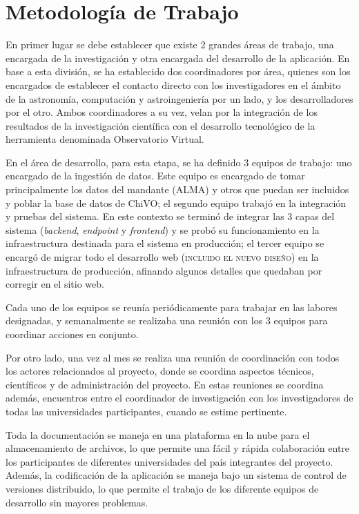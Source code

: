 \section{Metodología de Trabajo}

En primer lugar se debe establecer que existe 2 grandes áreas de trabajo, una encargada de la investigación y otra encargada del desarrollo de la aplicación. En base a esta división, se ha establecido dos coordinadores por área, quienes son los encargados de establecer el contacto directo con los investigadores en el ámbito de la astronomía, computación y astroingeniería por un lado, y los desarrolladores por el otro. Ambos coordinadores a su vez, velan por la integración de los resultados de la investigación científica con el desarrollo tecnológico de la herramienta denominada Observatorio Virtual.

En el área de desarrollo, para esta etapa, se ha definido 3 equipos de trabajo: uno encargado de la ingestión de datos. Este equipo es encargado de tomar principalmente los datos del mandante (ALMA) y otros que puedan ser incluidos y poblar la base de datos de ChiVO; el segundo equipo trabajó en la integración y pruebas del sistema. En este contexto se terminó de integrar las 3 capas del sistema (\emph{backend}, \emph{endpoint} y \emph{frontend}) y se probó su funcionamiento en la infraestructura destinada para el sistema en producción; el tercer equipo se encargó de migrar todo el desarrollo web (\textsc{incluido el nuevo diseño}) en la infraestructura de producción, afinando algunos detalles que quedaban por corregir en el sitio web.

Cada uno de los equipos se reunía periódicamente para trabajar en las labores designadas, y semanalmente se realizaba una reunión con los 3 equipos para coordinar acciones en conjunto.

Por otro lado, una vez al mes se realiza una reunión de coordinación con todos los actores relacionados al proyecto, donde se coordina aspectos técnicos, científicos y de administración del proyecto. En estas reuniones se coordina además, encuentros entre el coordinador de investigación con los investigadores de todas las universidades participantes, cuando se estime pertinente.

Toda la documentación se maneja en una plataforma en la nube para el almacenamiento de archivos, lo que permite una fácil y rápida colaboración entre los participantes de diferentes universidades del país integrantes del proyecto. Además, la codificación de la aplicación se maneja bajo un sistema de control de versiones distribuido, lo que permite el trabajo de los diferente equipos de desarrollo sin mayores problemas.


